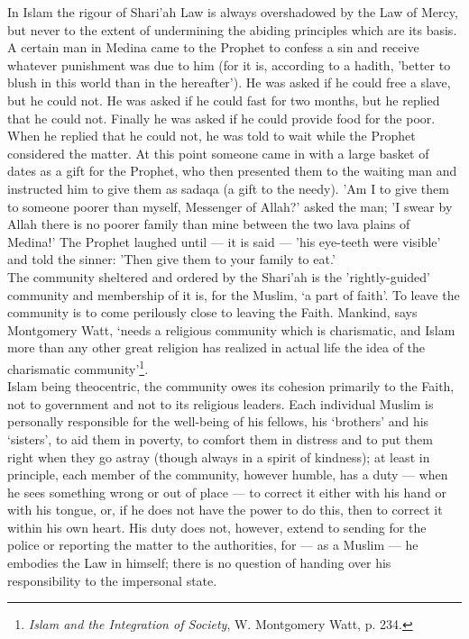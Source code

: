 \documentclass[10pt, twoside]{book}
\begin{document}
In Islam the rigour of Shari'ah Law is always overshadowed by the Law of Mercy, but never to the 
extent of undermining the abiding principles which are its basis. A certain man in Medina came to the 
Prophet to confess a sin and receive whatever punishment was due to him (for it is, according to a 
hadith, 'better to blush in this world than in the hereafter'). He was asked if he could free a 
slave, but he could not. He was asked if he could fast for two months, but he replied that he could 
not. Finally he was asked if he could provide food for the poor. When he replied that he could not, 
he was told to wait while the Prophet considered the matter. At this point someone came in with a 
large basket of dates as a gift for the Prophet, who then presented them to the waiting man and 
instructed him to give them as sadaqa (a gift to the needy). 'Am I to give them to someone poorer 
than myself, Messenger of Allah?' asked the man; 'I swear by Allah there is no poorer family than 
mine between the two lava plains of Medina!' The Prophet laughed until --- it is said --- 'his eye\hyp{}teeth 
were visible' and told the sinner: 'Then give them to your family to eat.' \\

The community sheltered and ordered by the Shari'ah is the 'rightly\hyp{}guided' community and membership 
of it is, for the Muslim, `a part of faith'. To leave the community is to come perilously close to 
leaving the Faith. Mankind, says Montgomery Watt, `needs a religious community which is charismatic, 
and Islam more than any other great religion has realized in actual life the idea of the charismatic 
community'\footnote{\emph{Islam and the Integration of Society}, W. Montgomery Watt, p. 234.}. \\

Islam being theocentric, the community owes its cohesion primarily to the Faith, not to government 
and not to its religious leaders. Each individual Muslim is personally responsible for the well-being 
of his fellows, his `brothers' and his `sisters', to aid them in poverty, to comfort them in distress 
and to put them right when they go astray (though always in a spirit of kindness); at least in 
principle, each member of the community, however humble, has a duty --- when he sees something wrong or 
out of place --- to correct it either with his hand or with his tongue, or, if he does not have the 
power to do this, then to correct it within his own heart. His duty does not, however, extend to 
sending for the police or reporting the matter to the authorities, for --- as a Muslim --- he embodies 
the Law in himself; there is no question of handing over his responsibility to the impersonal state. \\
\end{document}
